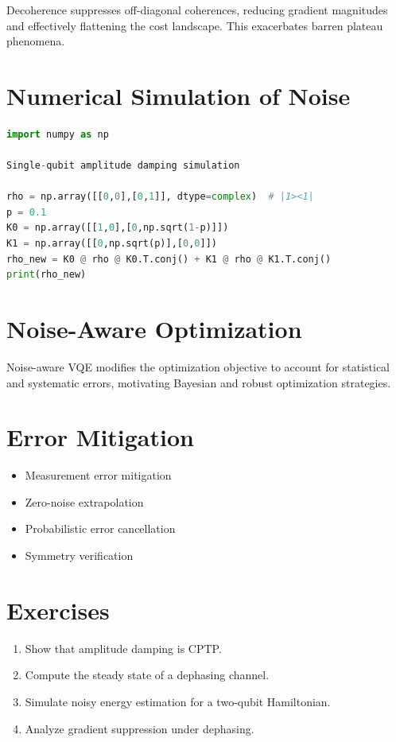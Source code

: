 \documentclass{book}
\begin{document}
Decoherence suppresses off-diagonal coherences, reducing gradient magnitudes and effectively flattening the cost landscape. This exacerbates barren plateau phenomena.

\section{Numerical Simulation of Noise}

\begin{lstlisting}[language=Python]
import numpy as np

Single-qubit amplitude damping simulation

rho = np.array([[0,0],[0,1]], dtype=complex)  # |1><1|
p = 0.1
K0 = np.array([[1,0],[0,np.sqrt(1-p)]])
K1 = np.array([[0,np.sqrt(p)],[0,0]])
rho_new = K0 @ rho @ K0.T.conj() + K1 @ rho @ K1.T.conj()
print(rho_new)
\end{lstlisting}

\section{Noise-Aware Optimization}

Noise-aware VQE modifies the optimization objective to account for statistical and systematic errors, motivating Bayesian and robust optimization strategies.

\section{Error Mitigation}

\begin{itemize}
\item Measurement error mitigation
\item Zero-noise extrapolation
\item Probabilistic error cancellation
\item Symmetry verification
\end{itemize}

\section{Exercises}

\begin{enumerate}
\item Show that amplitude damping is CPTP.
\item Compute the steady state of a dephasing channel.
\item Simulate noisy energy estimation for a two-qubit Hamiltonian.
\item Analyze gradient suppression under dephasing.
\end{enumerate}
\end{document}
